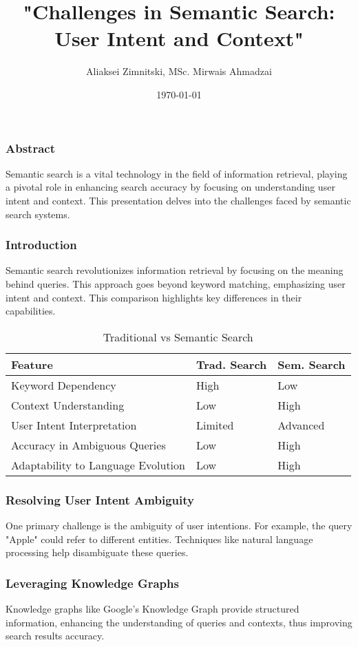 \documentclass{beamer}
\title[Semantic Search Challenges]{"Challenges in Semantic Search: User Intent and Context"}
\author{Aliaksei Zimnitski, MSc. Mirwais Ahmadzai}
\institute[STU]{Slovenská technická univerzita v Bratislave}
\date{\today}
\begin{document}
\frame{\titlepage}

\begin{frame}
\frametitle{Abstract}
Semantic search is a vital technology in the field of information retrieval, playing a pivotal role in enhancing search accuracy by focusing on understanding user intent and context. This presentation delves into the challenges faced by semantic search systems.
\end{frame}

\begin{frame}
\frametitle{Introduction}
Semantic search revolutionizes information retrieval by focusing on the meaning behind queries. This approach goes beyond keyword matching, emphasizing user intent and context.
\newline
\newline
This comparison highlights key differences in their capabilities.
\begin{table}
\centering
\small %
\setlength{\tabcolsep}{3pt} %
\renewcommand{\arraystretch}{1.2} %
\begin{tabular}{|l|l|l|}
\hline
\textbf{Feature} & \textbf{Trad. Search} & \textbf{Sem. Search} \\ \hline
Keyword Dependency & High & Low \\ \hline
Context Understanding & Low & High \\ \hline
User Intent Interpretation & Limited & Advanced \\ \hline
Accuracy in Ambiguous Queries & Low & High \\ \hline
Adaptability to Language Evolution & Low & High \\ \hline
\end{tabular}
\caption{Traditional vs Semantic Search}
\label{tab:compact_search_comparison}
\end{table}


\end{frame}

\begin{frame}
\frametitle{Resolving User Intent Ambiguity}
One primary challenge is the ambiguity of user intentions. For example, the query "Apple" could refer to different entities. Techniques like natural language processing help disambiguate these queries.
\end{frame}

\begin{frame}
\frametitle{Leveraging Knowledge Graphs}
Knowledge graphs like Google's Knowledge Graph provide structured information, enhancing the understanding of queries and contexts, thus improving search results accuracy.
\end{frame}
\end{document}
